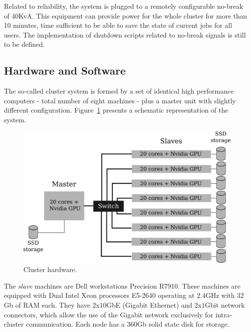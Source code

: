 \documentclass[twoside,a4paper,12pt,english]{inac17}
\begin{document}
Related to reliability, the system is plugged to a remotely configurable no-break of 40KvA. This equipment
can provide power for the whole cluster for more than 10 minutes, time sufficient to be able to save the state of current jobs
for all users. The implementation of shutdown scripts related to no-break signals is still to be defined.

\subsection{Hardware and Software}

The so-called cluster system is formed by a set of identical high performance computers -
total number of eight machines - plus a master unit with slightly different configuration.
Figure~\ref{fig:cluster} presents a schematic representation of the system.

\begin{figure}[h] %
  \centering\includegraphics[scale=0.7]{images/cluster-topologico.png}
  \caption{Cluster hardware.}
  \label{fig:cluster}
\end{figure}

The \textit{slave} machines are Dell workstations Precision R7910. These machines are equipped
with Dual Intel{\textregistered} Xeon{\textregistered} processors E5-2640 operating at $2.4$GHz with
$32$Gb of RAM each. They have 2x$10$GbE (Gigabit Ethernet) and 2x$1$Gbit network connectors, which
allow the use of the Gigabit network exclusively for intra-cluster communication. Each node
has a $360$Gb solid state disk for storage.
\end{document}
